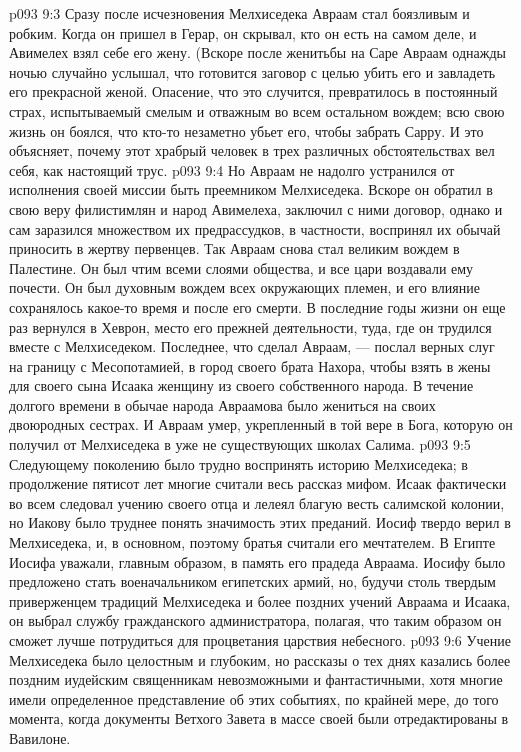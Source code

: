 \vs p093 9:3 Сразу после исчезновения Мелхиседека Авраам стал боязливым и робким. Когда он пришел в Герар, он скрывал, кто он есть на самом деле, и Авимелех взял себе его жену. (Вскоре после женитьбы на Саре Авраам однажды ночью случайно услышал, что готовится заговор с целью убить его и завладеть его прекрасной женой. Опасение, что это случится, превратилось в постоянный страх, испытываемый смелым и отважным во всем остальном вождем; всю свою жизнь он боялся, что кто\hyp{}то незаметно убьет его, чтобы забрать Сарру. И это объясняет, почему этот храбрый человек в трех различных обстоятельствах вел себя, как настоящий трус.
\vs p093 9:4 Но Авраам не надолго устранился от исполнения своей миссии быть преемником Мелхиседека. Вскоре он обратил в свою веру филистимлян и народ Авимелеха, заключил с ними договор, однако и сам заразился множеством их предрассудков, в частности, воспринял их обычай приносить в жертву первенцев. Так Авраам снова стал великим вождем в Палестине. Он был чтим всеми слоями общества, и все цари воздавали ему почести. Он был духовным вождем всех окружающих племен, и его влияние сохранялось какое\hyp{}то время и после его смерти. В последние годы жизни он еще раз вернулся в Хеврон, место его прежней деятельности, туда, где он трудился вместе с Мелхиседеком. Последнее, что сделал Авраам, --- послал верных слуг на границу с Месопотамией, в город своего брата Нахора, чтобы взять в жены для своего сына Исаака женщину из своего собственного народа. В течение долгого времени в обычае народа Авраамова было жениться на своих двоюродных сестрах. И Авраам умер, укрепленный в той вере в Бога, которую он получил от Мелхиседека в уже не существующих школах Салима.
\vs p093 9:5 \pc Следующему поколению было трудно воспринять историю Мелхиседека; в продолжение пятисот лет многие считали весь рассказ мифом. Исаак фактически во всем следовал учению своего отца и лелеял благую весть салимской колонии, но Иакову было труднее понять значимость этих преданий. Иосиф твердо верил в Мелхиседека, и, в основном, поэтому братья считали его мечтателем. В Египте Иосифа уважали, главным образом, в память его прадеда Авраама. Иосифу было предложено стать военачальником египетских армий, но, будучи столь твердым приверженцем традиций Мелхиседека и более поздних учений Авраама и Исаака, он выбрал службу гражданского администратора, полагая, что таким образом он сможет лучше потрудиться для процветания царствия небесного.
\vs p093 9:6 Учение Мелхиседека было целостным и глубоким, но рассказы о тех днях казались более поздним иудейским священникам невозможными и фантастичными, хотя многие имели определенное представление об этих событиях, по крайней мере, до того момента, когда документы Ветхого Завета в массе своей были отредактированы в Вавилоне.
